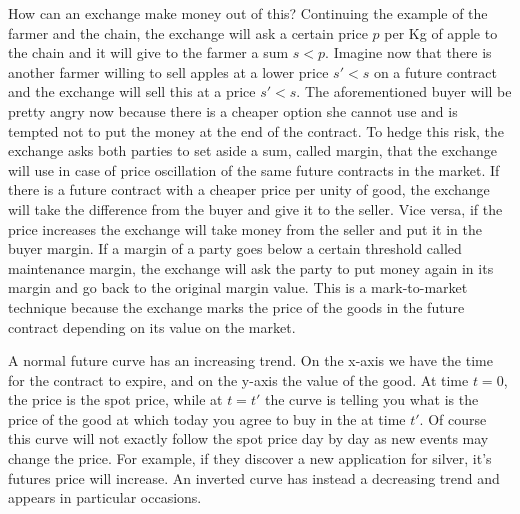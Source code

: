 How can an exchange make money out of this? Continuing the example of the farmer and the chain, the exchange will ask a certain price $p$ per Kg of apple to the chain and it will give to the farmer a sum $s < p$. Imagine now that there is another farmer willing to sell apples at a lower price $s' < s$ on a future contract and the exchange will sell this at a price $s' < s$. The aforementioned buyer will be pretty angry now because there is a cheaper option she cannot use and is tempted not to put the money at the end of the contract. To hedge this risk, the exchange asks both parties to set aside a sum, called margin, that the exchange will use in case of price oscillation of the same future contracts in the market. If there is a future contract with a cheaper price per unity of good, the exchange will take the difference from the buyer and give it to the seller. Vice versa, if the price increases the exchange will take money from the seller and put it in the buyer margin. If a margin of a party goes below a certain threshold called maintenance margin, the exchange will ask the party to put money again in its margin and go back to the original margin value. This is a mark-to-market technique because the exchange marks the price of the goods in the future contract depending on its value on the market.

A normal future curve has an increasing trend. On the x-axis we have the time for the contract to expire, and on the y-axis the value of the good. At time $t = 0$, the price is the spot price, while at $t = t'$ the curve is telling you what is the price of the good at which today you agree to buy in the at time $t'$. Of course this curve will not exactly follow the spot price day by day as new events may change the price. For example, if they discover a new application for silver, it's futures price will increase. An inverted curve has instead a decreasing trend and appears in particular occasions. 

